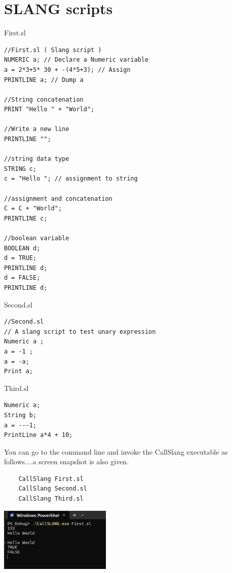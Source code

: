 \section{SLANG scripts}
First.sl
\lstset{style=csharp}
\begin{lstlisting}
//First.sl ( Slang script )
NUMERIC a; // Declare a Numeric variable
a = 2*3+5* 30 + -(4*5+3); // Assign
PRINTLINE a; // Dump a

//String concatenation
PRINT "Hello " + "World";

//Write a new line
PRINTLINE "";

//string data type
STRING c;
c = "Hello "; // assignment to string

//assignment and concatenation
C = C + "World";
PRINTLINE c;

//boolean variable
BOOLEAN d;
d = TRUE;
PRINTLINE d;
d = FALSE;
PRINTLINE d;
\end{lstlisting}
Second.sl
\lstset{style=csharp}
\begin{lstlisting}
//Second.sl
// A slang script to test unary expression
Numeric a ;
a = -1 ;
a = -a;
Print a;
\end{lstlisting}
Third.sl
\lstset{style=csharp}
\begin{lstlisting}
Numeric a;
String b;
a = ---1;
PrintLine a*4 + 10;
\end{lstlisting}
You can go to the command line and invoke the CallSlang executable as follows....a screen snapshot is also given.
\begin{verbatim}
	CallSlang First.sl
	CallSlang Second.sl
	CallSlang Third.sl
\end{verbatim}
\includegraphics[width=0.4\textwidth]{first.png}
